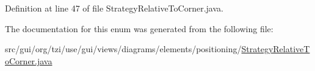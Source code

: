 Definition at line 47 of file Strategy\-Relative\-To\-Corner.\-java.



The documentation for this enum was generated from the following file\-:\begin{DoxyCompactItemize}
\item 
src/gui/org/tzi/use/gui/views/diagrams/elements/positioning/\hyperlink{_strategy_relative_to_corner_8java}{Strategy\-Relative\-To\-Corner.\-java}\end{DoxyCompactItemize}
